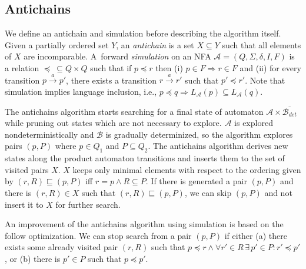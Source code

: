 \documentclass{eeict}
\begin{document}
\subsection{Antichains}
We define an antichain and simulation before describing the algorithm itself. 
Given a partially ordered set $Y$, an \emph {antichain} is a set $X \subseteq Y$ such that all elements of $X$ are incomparable.
A~forward \emph{simulation} on an NFA $\mathcal{A}=(Q,\Sigma,\delta,I,F)$ is a relation $\preceq\  \subseteq Q \times Q$ 
such that if $p \preceq r$ then (i) $p \in F 
\Rightarrow r \in F$ and (ii) for every transition $p\xrightarrow{a}p'$, there exists a transition 
$r\xrightarrow{a}r'$ such that $p' \preceq r'$. Note that simulation implies language inclusion, i.e., $p\preceq q \Rightarrow L_\mathcal{A}(p)
\subseteq L_\mathcal{A}(q)$.

The antichains algorithm \cite{cav06} starts searching for a final state of automaton $\mathcal{A}\times \overline{\mathcal{B}_{det}}$ while
pruning out states which are not necessary to explore. $\mathcal{A}$ is explored nondeterministically and $\mathcal{B}$ 
is gradually determinized, so the algorithm explores pairs $(p,P)$ where $p\in Q_1$ and $P\subseteq Q_2$. 
The antichains algorithm derives new states along the product automaton transitions and inserts them to the set of visited pairs $X$.
$X$ keeps only minimal elements with respect to the ordering given by $(r,R)\sqsubseteq (p,P)$ iff $r=p \wedge R \subseteq P$. 
If there is generated a pair $(p,P)$ and there is 
$(r,R)\in X$ such that $(r,R) \sqsubseteq (p,P)$, we can skip $(p,P)$ and not insert it to $X$ for further search.
 
An improvement of the antichains algorithm using simulation \cite{tacas10} is based on the follow optimization. 
We can stop search from a pair $(p,P)$ if either (a) there exists some already visited pair $(r,R)$ 
such that $p\preceq r \wedge \forall r'\in R\, \exists\, p' \in P: r' \preceq p'$, or (b) there is $p' \in P$ such that $p \preceq p'$.
\end{document}
